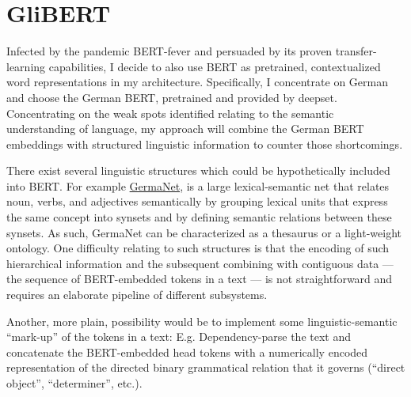 \section{GliBERT}

Infected by the pandemic BERT-fever and persuaded by its proven transfer-learning capabilities,
I decide to also use BERT as pretrained, contextualized word representations in my architecture.
Specifically, I concentrate on German and choose the German BERT, pretrained and provided by
deepset. Concentrating on the weak spots
identified relating to the semantic understanding of language, my approach will combine the
German BERT embeddings with structured linguistic information to counter those shortcomings.

There exist several linguistic structures which could
be hypothetically included into BERT. For example
\href{https://uni-tuebingen.de/en/faculties/faculty-of-humanities/departments/modern-languages/department-of-linguistics/chairs/general-and-computational-linguistics/ressources/lexica/germanet/}{GermaNet},
\citep{hamp1997germanet} is a large lexical-semantic net
that relates noun, verbs, and adjectives semantically
by grouping lexical units that express the same concept
into synsets and by defining semantic relations between
these synsets. As such, GermaNet can be characterized as
a thesaurus or a light-weight ontology. One difficulty
relating to such structures is that the encoding of such
hierarchical information and the subsequent combining
with contiguous data --- the sequence of BERT-embedded
tokens in a text --- is not straightforward and requires
an elaborate pipeline of different subsystems.

Another, more plain, possibility would be to implement some linguistic-semantic ``mark-up'' of
the tokens in a text: E.g. Dependency-parse the text and concatenate the BERT-embedded head tokens
with a numerically encoded representation of the directed binary grammatical relation
that it governs (``direct object'', ``determiner'', etc.).


